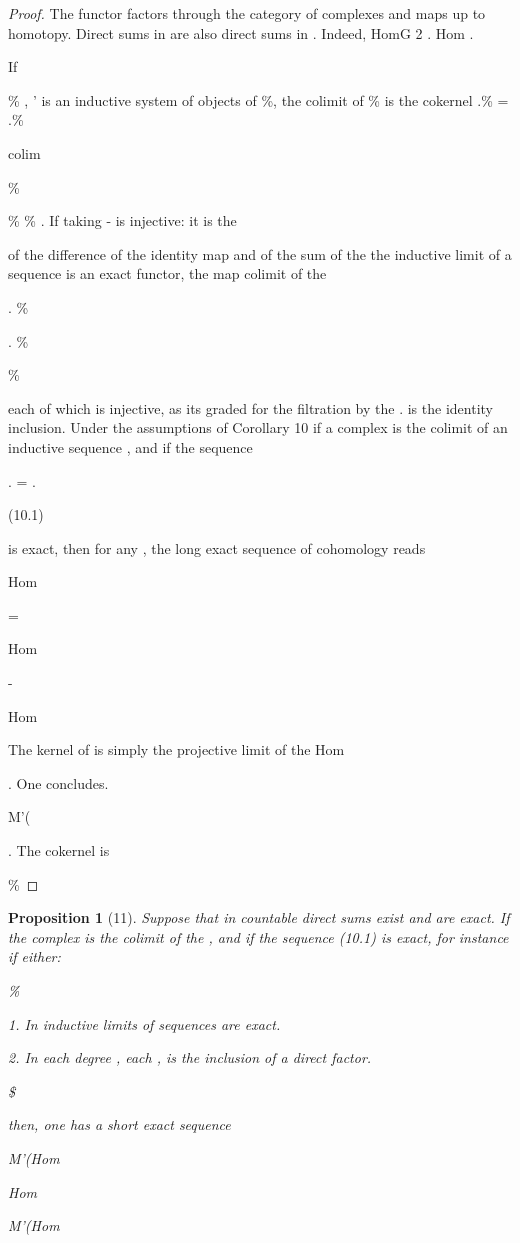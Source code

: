 \documentclass[11pt,a4paper]{article}
\theoremstyle{plain}
\newtheorem{proposition}[theorem]{Proposition}
\theoremstyle{definition}
\begin{document}
\begin{proof} The functor
factors through the category
of complexes and maps up to homotopy. Direct sums in
are also direct sums in
.
Indeed,
HomG 2 . 
Hom . 

If

\% , '   is an inductive system of objects of \%, the colimit of \% is the cokernel
.\% = .\%

colim

\%





\% \% . If taking
- is injective: it is the

of the difference of the identity map and of the sum of the
the inductive limit of a sequence is an exact functor, the map
colimit of the

. \%

.   \%

\%

each of which is injective, as its graded for the filtration by the .   is the identity
inclusion.
Under the assumptions of Corollary 10 if a complex
is the colimit of an
inductive sequence  , and if the sequence

 .  = . 



(10.1)

is exact, then for any , the long exact sequence of cohomology reads

  

Hom



   =

Hom

-



Hom

The kernel of is simply the projective limit of the Hom

. One concludes.

M'(

  

   . The cokernel is

\%

\end{proof}

\begin{proposition}[11]
Suppose that in countable direct sums exist and are exact. If the
complex is the colimit of the  , and if the sequence (10.1) is exact, for instance
if either:

\%

1. In inductive limits of sequences are exact.

2. In each degree , each 
  , is the inclusion of a direct factor.

\$

then, one has a short exact sequence

 M'(Hom   

Hom

   M'(Hom    

\end{proposition}
\end{document}
